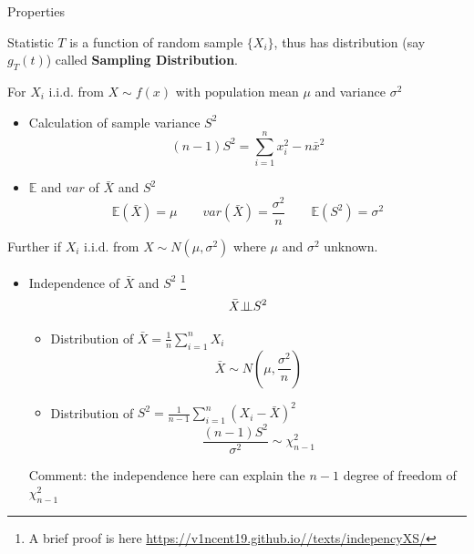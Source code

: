     \begin{point}
        Properties
    \end{point}
    
        

    Statistic $T$ is a function of random sample $\{X_i\}$, thus has distribution (say $g_T(t)$) called \textbf{Sampling Distribution}.

        For $X_i$ i.i.d. from $X\sim f(x)$ with population mean $\mu$ and variance $\sigma^2$
    \begin{itemize}
        \item Calculation of sample variance $S^2$
        \begin{equation}(n-1)S^2=\sum_{i=1}^n x_i^2-n\bar{x}^2\end{equation}
        \item $\mathbb{E}$ and $var$ of $\bar{X}$ and $S^2$
        \begin{equation}\mathbb{E}(\bar{X})=\mu\qquad var(\bar{X})=\frac{\sigma^2}{n}\qquad \mathbb{E}(S^2)=\sigma^2\end{equation}
    \end{itemize}

    Further if $X_i$ i.i.d. from $X\sim N(\mu,\sigma^2)$ where $\mu$ and $\sigma^2$ unknown.
    \begin{itemize}
        \item Independence of $\bar{X}$ and $S^2$ \footnote{A brief proof is here \url{https://v1ncent19.github.io//texts/indepencyXS/}}
            \begin{equation}
            \bar{X}\bot\!\!\!\bot S^2
            \end{equation}
        \begin{itemize}[topsep=6pt,itemsep=4pt]
        \item Distribution of $\bar{X}={\displaystyle\frac{1}{n}\sum_{i=1}^n X_i}$
        \begin{equation}\bar{X}\sim N(\mu,\frac{\sigma^2}{n})\end{equation}
        \item Distribution of $S^2={\displaystyle\frac{1}{n-1}\sum_{i=1}^n(X_i-\bar{X})^2}$
        \begin{equation}\frac{(n-1)S^2}{\sigma^2}\sim\chi^2_{n-1}\end{equation}
        \end{itemize}     
        Comment: the independence here can explain the $ n-1 $ degree of freedom of $ \chi^2_{n-1} $   
    \end{itemize}

